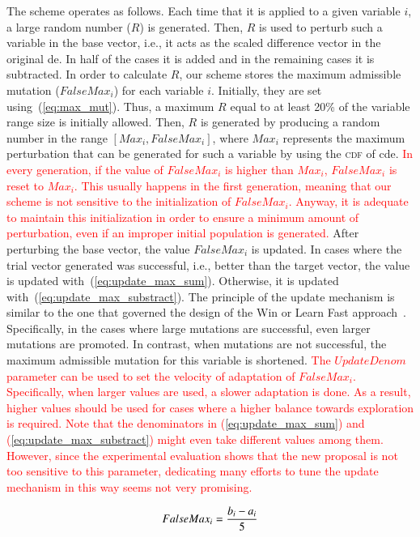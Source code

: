 \documentclass[preprint,3p]{elsarticle}
\newcommand{\CDE}{c{\sc de}}
\newcommand{\DE}{{\sc de}}
\begin{document}
The scheme operates as follows.
%
Each time that it is applied to a given variable $i$, a large random number ($R$) is generated.
%
Then, $R$ is used to perturb such a variable in the base vector, i.e., it acts as the scaled difference vector in the original \DE{}.
%
In half of the cases it is added and in the remaining cases it is subtracted.
%
In order to calculate $R$, our scheme stores the maximum admissible mutation ($FalseMax_i$) for each variable $i$.
%
Initially, they are set using~(\ref{eq:max_mut}).
%
Thus, a maximum $R$ equal to at least 20\% of the variable range size is initially allowed.
%
Then, $R$ is generated by producing a random number in the range $[Max_i, FalseMax_i]$, 
where $Max_i$ represents the maximum perturbation that can be generated for such a variable by using the \textsc{cdf} of \CDE{}.
%
\textcolor{red}{
In every generation, if the value of $FalseMax_i$ is higher than $Max_i$, $FalseMax_i$ is reset to $Max_i$.
%
This usually happens in the first generation, meaning that our scheme is not sensitive to the initialization of $FalseMax_i$.
%
Anyway, it is adequate to maintain this initialization in order to ensure a minimum amount of perturbation, even if
an improper initial population is generated.
}
%
After perturbing the base vector, the value $FalseMax_i$ is updated.
%
In cases where the trial vector generated was successful, i.e., better than the target vector,
the value is updated with~(\ref{eq:update_max_sum}).
%
Otherwise, it is updated with~(\ref{eq:update_max_substract}).
%
The principle of the update mechanism is 
similar to the one that governed the design of the Win or Learn Fast approach~\cite{Bowling:01}.
%
Specifically, in the cases where large mutations are successful, even larger mutations
are promoted.
%
In contrast, when mutations are not successful, the maximum admissible mutation for this variable is shortened.
%
\textcolor{red}{
The $UpdateDenom$ parameter can be used to set the velocity of adaptation of $FalseMax_i$.
%
Specifically, when larger values are used, a slower adaptation is done.
%
As a result, higher values should be used for cases where a higher balance towards exploration is required.
%
Note that the denominators in (\ref{eq:update_max_sum}) and (\ref{eq:update_max_substract}) might even take different values among them.
%
However, since the experimental evaluation shows that the new proposal is not too sensitive to this parameter, dedicating many
efforts to tune the update mechanism in this way seems not very promising.
}

\begin{equation}
	\label{eq:max_mut}
		FalseMax_i = {{b_i - a_i}\over{5}}
\end{equation}
\end{document}
